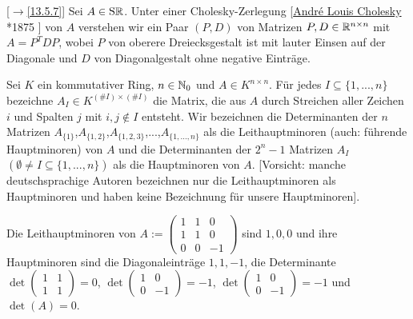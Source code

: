 \documentclass[../../main.tex]{subfiles}
\begin{document}
\begin{df}\mbox{}[$\to$\ref{13.5.7}]
\label{14.2.8}
Sei $A\in \operatorname{S\mathbb R}$. Unter einer Cholesky-Zerlegung [\href{https://en.wikipedia.org/wiki/Andre-Louis_Cholesky}{Andr\'{e} Louis Cholesky} *1875 ] von $A$ verstehen wir ein Paar $(P,D)$ von Matrizen $P,D\in \mathbb R^{n\times n}$ mit $A=P^TDP$, wobei $P$ von oberere Dreiecksgestalt ist mit lauter Einsen auf der Diagonale und $D$ von Diagonalgestalt ohne negative Einträge.
\end{df}

\begin{df}\label{14.2.9}
Sei $K$ ein kommutativer Ring, $n\in \mathbb N_0$ und $A\in K^{n\times n}$. Für jedes $I\subseteq\{1,...,n\}$ bezeichne $A_I\in K^{(\#I)\times (\#I)}$ die Matrix, die aus $A$ durch Streichen aller Zeichen $i$ und Spalten $j$ mit $i,j\notin I$ entsteht. Wir bezeichnen die Determinanten der $n$ Matrizen $A_{\{1\}}$,$A_{\{1,2\}}$,$A_{\{1,2,3\}}$,...,$A_{\{1,...,n\}}$ als die Leithauptminoren (auch: führende Hauptminoren) von $A$ und die Determinanten der $2^{n}-1$ Matrizen $A_I$ $(\emptyset \neq I\subseteq\{1,...,n\})$ als die Hauptminoren von $A$. [Vorsicht: manche deutschsprachige Autoren bezeichnen nur die Leithauptminoren als Hauptminoren und haben keine Bezeichnung für unsere Hauptminoren].
\end{df}

\begin{bsp}\label{14.2.10}
Die Leithauptminoren von $A:=\begin{pmatrix*}1&1&0\\1&1&0\\ 0&0&-1\end{pmatrix*}$ sind $1,0,0$ und ihre Hauptminoren sind die Diagonaleinträge $1,1,-1$, die Determinante $\det\begin{pmatrix*}1&1\\1&1\end{pmatrix*}=0$, $\det\begin{pmatrix*}1&0\\0&-1\end{pmatrix*}=-1$, $\det\begin{pmatrix*}1&0\\0&-1\end{pmatrix*}=-1$ und $\det(A)=0$.
\end{bsp}
\end{document}
